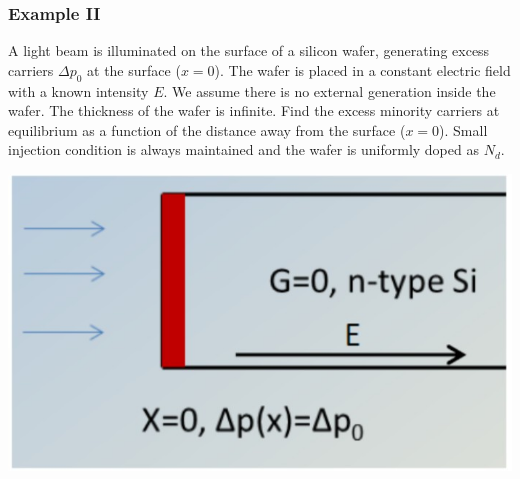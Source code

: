 \documentclass{beamer}
\begin{document}
    \begin{frame} \frametitle{Example II}
        \par A light beam is illuminated on the surface of a silicon wafer, generating excess carriers $\Delta p_0$ at the surface ($x = 0$). The wafer is placed in a constant electric field with a known intensity $E$. We assume there is no external generation inside the wafer. The thickness of the wafer is infinite. Find the excess minority carriers at equilibrium as a function of the distance away from the surface ($x = 0$). Small injection condition is always maintained and the wafer is uniformly doped as $N_d$. \\[3em]
        \begin{minipage}{\linewidth}
            \begin{minipage}{0.3\linewidth}
                \includegraphics[width=\linewidth]{Example-2.jpg}
            \end{minipage}
            \begin{minipage}{0.69\linewidth}
            \end{minipage}
        \end{minipage}
    \end{frame}
\end{document}
